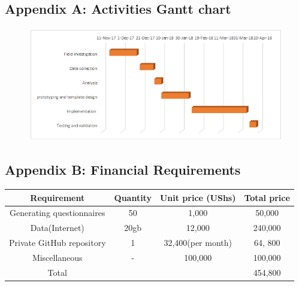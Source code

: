 \documentclass[12pt]{article}
\begin{document}
\subsection{Appendix A: Activities Gantt chart}
\begin{figure}[h]
	\begin{center} \includegraphics[width=1\linewidth]{gantt.png} \end{center}
\end{figure}
\subsection{Appendix B: Financial Requirements}
\begin{tabular} {|c|c|c|c|}
	\hline
	Requirement & Quantity & Unit price (UShs) & Total price \\ \hline
	Generating questionnaires & 50 &  1,000 & 50,000 \\ \hline
	Data(Internet) & 20gb &  12,000 & 240,000 \\ \hline
	Private GitHub repository & 1 &  32,400(per month) & 64, 800\\ \hline
	Miscellaneous & -  & 100,000 & 100,000\\ \hline
	Total &  &  & 454,800\\ \hline
\end{tabular}
\end{document}
